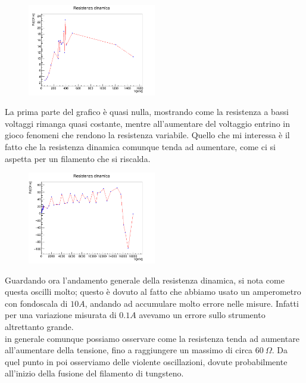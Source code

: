\documentclass[10pt,twocolumn]{article}
\begin{document}
\begin{figure}[H] %
  \centering
  \includegraphics[width=0.5\textwidth]{curva_voltammetrica/resistenza_dinamica_zoom.png} %
  \label{fig:I_V_}
\end{figure}
\noindent La prima parte del grafico è quasi nulla, mostrando come la resistenza a bassi voltaggi rimanga quasi costante, mentre all'aumentare del voltaggio entrino in gioco fenomeni che rendono la resistenza variabile. 
Quello che mi interessa è il fatto che la resistenza dinamica comunque tenda ad aumentare, come ci si aspetta per un filamento che si riscalda.
\begin{figure}[H] %
  \centering
  \includegraphics[width=0.5\textwidth]{curva_voltammetrica/resistenza_dinamica.png} %
  \label{fig:I_V_}
\end{figure}
\noindent Guardando ora l'andamento generale della resistenza dinamica, si nota come questa oscilli molto; questo è dovuto al fatto che abbiamo usato un amperometro con fondoscala di $10 A$, andando ad accumulare molto errore nelle misure. Infatti per una variazione misurata di $0.1 A$ avevamo un errore sullo strumento altrettanto grande.\\
in generale comunque possiamo osservare come la resistenza tenda ad aumentare all'aumentare della tensione, fino a raggiungere un massimo di circa $60 \: \Omega$. 
Da quel punto in poi osserviamo delle violente oscillazioni, dovute probabilmente all'inizio della fusione del filamento di tungsteno. 
\end{document}
